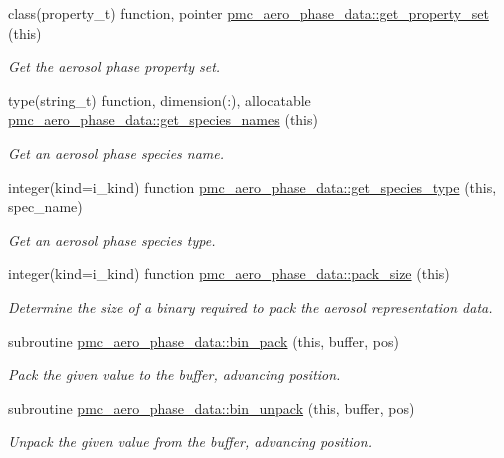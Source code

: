 \begin{DoxyCompactItemize}
class(property\+\_\+t) function, pointer \mbox{\hyperlink{namespacepmc__aero__phase__data_a6fa987c0d6f358d46d5b84410129c789}{pmc\+\_\+aero\+\_\+phase\+\_\+data\+::get\+\_\+property\+\_\+set}} (this)
\begin{DoxyCompactList}\small\item\em Get the aerosol phase property set. \end{DoxyCompactList}\item 
type(string\+\_\+t) function, dimension(\+:), allocatable \mbox{\hyperlink{namespacepmc__aero__phase__data_a0bdb92ba2634d7c4b8d15b63baee4311}{pmc\+\_\+aero\+\_\+phase\+\_\+data\+::get\+\_\+species\+\_\+names}} (this)
\begin{DoxyCompactList}\small\item\em Get an aerosol phase species name. \end{DoxyCompactList}\item 
integer(kind=i\+\_\+kind) function \mbox{\hyperlink{namespacepmc__aero__phase__data_afe51744f24e245997c36e00d63d577cf}{pmc\+\_\+aero\+\_\+phase\+\_\+data\+::get\+\_\+species\+\_\+type}} (this, spec\+\_\+name)
\begin{DoxyCompactList}\small\item\em Get an aerosol phase species type. \end{DoxyCompactList}\item 
integer(kind=i\+\_\+kind) function \mbox{\hyperlink{namespacepmc__aero__phase__data_aa8dcbc0de2a9877abc2e6c0f833c8493}{pmc\+\_\+aero\+\_\+phase\+\_\+data\+::pack\+\_\+size}} (this)
\begin{DoxyCompactList}\small\item\em Determine the size of a binary required to pack the aerosol representation data. \end{DoxyCompactList}\item 
subroutine \mbox{\hyperlink{namespacepmc__aero__phase__data_a3ee028d1595f33610a4359ddeb5fe249}{pmc\+\_\+aero\+\_\+phase\+\_\+data\+::bin\+\_\+pack}} (this, buffer, pos)
\begin{DoxyCompactList}\small\item\em Pack the given value to the buffer, advancing position. \end{DoxyCompactList}\item 
subroutine \mbox{\hyperlink{namespacepmc__aero__phase__data_ab248ad8c703acdfc5f771aaca4671218}{pmc\+\_\+aero\+\_\+phase\+\_\+data\+::bin\+\_\+unpack}} (this, buffer, pos)
\begin{DoxyCompactList}\small\item\em Unpack the given value from the buffer, advancing position. \end{DoxyCompactList}\item 

\end{DoxyCompactItemize}
